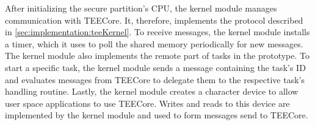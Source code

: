 After initializing the secure partition's CPU, the kernel module manages
communication with TEECore. It, therefore, implements the protocol described in
\ref{sec:implementation:teeKernel}. To receive messages, the kernel module
installs a timer, which it uses to poll the shared memory periodically for new
messages. The kernel module also implements the remote part of tasks in the
prototype. To start a specific task, the kernel module sends a message
containing the task's ID and evaluates messages from TEECore to delegate them to
the respective task's handling routine. Lastly, the kernel module creates a
character device to allow user space applications to use TEECore. Writes and
reads to this device are implemented by the kernel module and used to form
messages send to TEECore.


